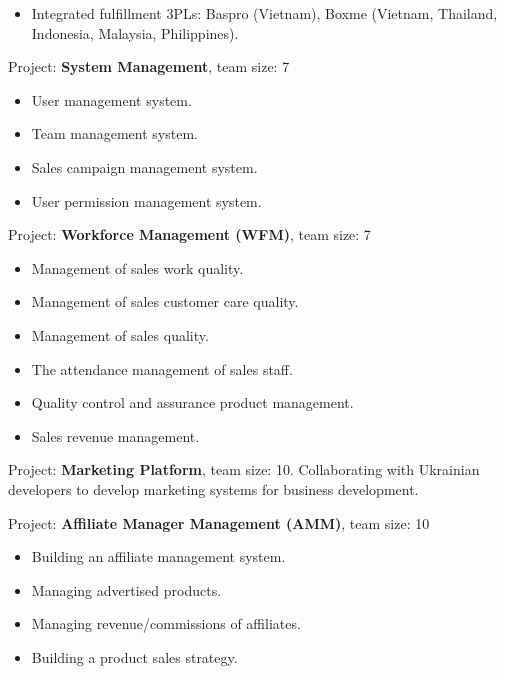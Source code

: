 {\begin{cvitems}
{\begin{itemize}
                \item { Integrated fulfillment 3PLs: Baspro (Vietnam), Boxme (Vietnam, Thailand, Indonesia, Malaysia, Philippines). }
            \end{itemize}
        }
        \item { Project: \textbf{System Management}, team size: 7 }
        { 
            \begin{itemize}
                \item { User management system. }
                \item { Team management system. }
                \item { Sales campaign management system. }
                \item { User permission management system. }
            \end{itemize}
        }
        \item { Project: \textbf{Workforce Management (WFM)}, team size: 7 }
        {
            \begin{itemize}
                \item { Management of sales work quality. }
                \item { Management of sales customer care quality. }
                \item { Management of sales quality. }
                \item { The attendance management of sales staff. }
                \item { Quality control and assurance product management. }
                \item { Sales revenue management. }
            \end{itemize}
        }
        \item { Project: \textbf{Marketing Platform}, team size: 10. Collaborating with Ukrainian developers to develop marketing systems for business development. }
        \item { Project: \textbf{Affiliate Manager Management (AMM)}, team size: 10 }
        {
            \begin{itemize}
                \item { Building an affiliate management system. }
                \item { Managing advertised products. }
                \item { Managing revenue/commissions of affiliates. }
                \item { Building a product sales strategy. }

\end{itemize}}
\end{cvitems}}
